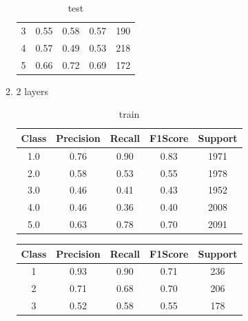 \begin{enumerate}[label=(\alph*)]
\begin{enumerate}[label=\roman*.]
\begin{table}[!htb]
\begin{tabular}{ccccc}
                            3     & 0.55      & 0.58   & 0.57    & 190     \\
                            4     & 0.57      & 0.49   & 0.53    & 218     \\
                            5     & 0.66      & 0.72   & 0.69    & 172     \\ \hline
                        \end{tabular}
                        \caption{test}
                        \label{part f test depth 1}
                    \end{table}
                    \newpage
              \item 2 layers
                    \begin{table}[!htb]
                        \centering
                        \begin{tabular}{ccccc}
                            \hline
                            Class & Precision & Recall & F1Score & Support \\ \hline
                            1.0   & 0.76      & 0.90   & 0.83    & 1971    \\
                            2.0   & 0.58      & 0.53   & 0.55    & 1978    \\
                            3.0   & 0.46      & 0.41   & 0.43    & 1952    \\
                            4.0   & 0.46      & 0.36   & 0.40    & 2008    \\
                            5.0   & 0.63      & 0.78   & 0.70    & 2091    \\ \hline
                        \end{tabular}
                        \caption{train}
                        \label{part f train depth 2}
                    \end{table}
                    \begin{table}[!htb]
                        \centering
                        \begin{tabular}{ccccc}
                            \hline
                            Class & Precision & Recall & F1Score & Support \\ \hline
                            1     & 0.93      & 0.90   & 0.71    & 236     \\
                            2     & 0.71      & 0.68   & 0.70    & 206     \\
                            3     & 0.52      & 0.58   & 0.55    & 178     \\

\end{tabular}
\end{table}
\end{enumerate}
\end{enumerate}
